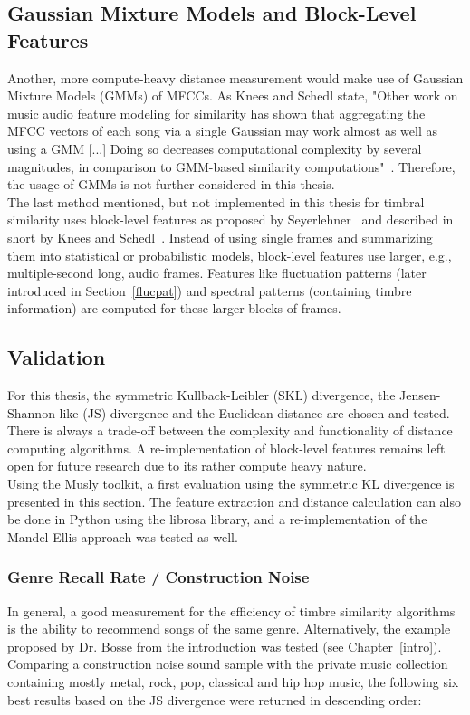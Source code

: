 \subsection{Gaussian Mixture Models and Block-Level Features}\label{blocklevel}
Another, more compute-heavy distance measurement would make use of Gaussian Mixture Models (GMMs) of MFCCs. As Knees and Schedl state, "Other work on music audio feature modeling for similarity has shown that aggregating the MFCC vectors of each song via a single Gaussian may work almost as well as using a GMM [...] Doing so decreases computational complexity by several magnitudes, in comparison to GMM-based similarity computations"~\cite[p. 65]{knees1}. Therefore, the usage of GMMs is not further considered in this thesis.\\
The last method mentioned, but not implemented in this thesis for timbral similarity uses block-level features as proposed by Seyerlehner~\cite{seyerlehnerblock} and described in short by Knees and Schedl~\cite[p. 67]{knees1}. Instead of using single frames and summarizing them into statistical or probabilistic models, block-level features use larger, e.g., multiple-second long, audio frames. Features like fluctuation patterns (later introduced in Section~\ref{flucpat}) and spectral patterns (containing timbre information) are computed for these larger blocks of frames. 

\subsection{Validation}

For this thesis, the symmetric Kullback-Leibler (SKL) divergence, the Jensen-Shannon-like (JS) divergence and the Euclidean distance are chosen and tested. There is always a trade-off between the complexity and functionality of distance computing algorithms. A re-implementation of block-level features remains left open for future research due to its rather compute heavy nature.\\
Using the Musly toolkit, a first evaluation using the symmetric KL divergence is presented in this section. The feature extraction and distance calculation can also be done in Python using the librosa library, and a re-implementation of the Mandel-Ellis approach was tested as well.\\

\subsubsection{Genre Recall Rate / Construction Noise}
In general, a good measurement for the efficiency of timbre similarity algorithms is the ability to recommend songs of the same genre. 
Alternatively, the example proposed by Dr. Bosse from the introduction was tested (see Chapter~\ref{intro}). Comparing a construction noise sound sample with the private music collection containing mostly metal, rock, pop, classical and hip hop music, the following six best results based on the JS divergence were returned in descending order: 

